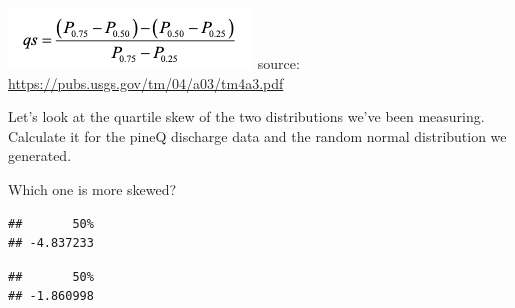 \documentclass[
]{book}
\newenvironment{Shaded}{\begin{snugshade}}{\end{snugshade}}
\newcommand{\DecValTok}[1]{\textcolor[rgb]{0.00,0.00,0.81}{#1}}
\newcommand{\FunctionTok}[1]{\textcolor[rgb]{0.00,0.00,0.00}{#1}}
\newcommand{\NormalTok}[1]{#1}
\newcommand{\OtherTok}[1]{\textcolor[rgb]{0.56,0.35,0.01}{#1}}
\newcommand{\SpecialCharTok}[1]{\textcolor[rgb]{0.00,0.00,0.00}{#1}}
\begin{document}
\includegraphics{images/Screen Shot 2021-01-25 at 11.27.14 AM.png} source: \url{https://pubs.usgs.gov/tm/04/a03/tm4a3.pdf}

Let's look at the quartile skew of the two distributions we've been measuring. Calculate it for the pineQ discharge data and the random normal distribution we generated.

Which one is more skewed?

\begin{Shaded}
\end{Shaded}

\begin{verbatim}
##       50% 
## -4.837233
\end{verbatim}

\begin{Shaded}
\end{Shaded}

\begin{verbatim}
##       50% 
## -1.860998
\end{verbatim}
\end{document}
